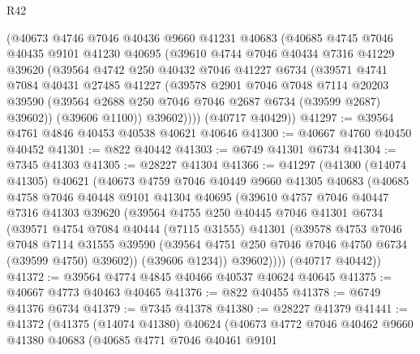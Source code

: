 \begin{lexlean}{R42}
\begin{coremodule}
{      (@40673
        @4746
        @7046
        @40436
        @9660
        @41231
        @40683
        (@40685
          @4745
          @7046
          @40435
          @9101
          @41230
          @40695
          (@39610
            @4744
            @7046
            @40434
            @7316
            @41229
            @39620
            (@39564
              @4742
              @250
              @40432
              @7046
              @41227
              @6734
              (@39571
                @4741
                @7084
                @40431
                @27485
                @41227
                (@39578
                  @2901
                  @7046
                  @7048
                  @7114
                  @20203
                  @39590
                  (@39564 @2688 @250 @7046 @7046 @2687 @6734 (@39599 @2687) @39602))
                (@39606 @1100))
              @39602))))
      (@40717 @40429))
@41297 := @39564 @4761 @4846 @40453 @40538 @40621 @40646
@41300 := @40667 @4760 @40450 @40452
@41301 := @822 @40442
@41303 := @6749 @41301 @6734
@41304 := @7345 @41303
@41305 := @28227 @41304
@41366 := @41297
    (@41300
      (@14074 @41305)
      @40621
      (@40673
        @4759
        @7046
        @40449
        @9660
        @41305
        @40683
        (@40685
          @4758
          @7046
          @40448
          @9101
          @41304
          @40695
          (@39610
            @4757
            @7046
            @40447
            @7316
            @41303
            @39620
            (@39564
              @4755
              @250
              @40445
              @7046
              @41301
              @6734
              (@39571
                @4754
                @7084
                @40444
                (@7115 @31555)
                @41301
                (@39578
                  @4753
                  @7046
                  @7048
                  @7114
                  @31555
                  @39590
                  (@39564 @4751 @250 @7046 @7046 @4750 @6734 (@39599 @4750) @39602))
                (@39606 @1234))
              @39602))))
      (@40717 @40442))
@41372 := @39564 @4774 @4845 @40466 @40537 @40624 @40645
@41375 := @40667 @4773 @40463 @40465
@41376 := @822 @40455
@41378 := @6749 @41376 @6734
@41379 := @7345 @41378
@41380 := @28227 @41379
@41441 := @41372
    (@41375
      (@14074 @41380)
      @40624
      (@40673
        @4772
        @7046
        @40462
        @9660
        @41380
        @40683
        (@40685
          @4771
          @7046
          @40461
          @9101
}
\end{coremodule}
\end{lexlean}
